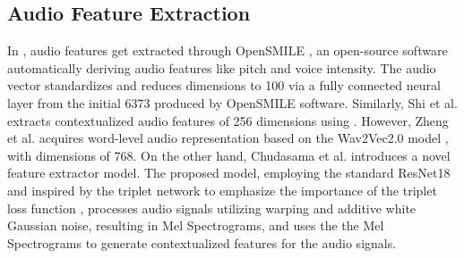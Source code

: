     \subsection{Audio Feature Extraction}
    In \cite{cmn, bclstm, dialoguernn, dialoguetrm, multiemo}, audio features get extracted through OpenSMILE \cite{opensmile}, an open-source software automatically deriving audio features like pitch and voice intensity. The audio vector standardizes and reduces dimensions to 100 via a fully connected neural layer from the initial 6373 produced by OpenSMILE software. Similarly, Shi et al. \cite{multiemo} extracts contextualized audio features of 256 dimensions using \cite{dialoguernn}. However, Zheng et al. \cite{fmmt} acquires word-level audio representation based on the Wav2Vec2.0 model \cite{w2v}, with dimensions of 768. On the other hand, Chudasama et al. \cite{m2fnet} introduces a novel feature extractor model. The proposed model, employing the standard ResNet18 \cite{resnet} and inspired by the triplet network to emphasize the importance of the triplet loss function \cite{facenet}, processes audio signals utilizing warping and additive white Gaussian noise, resulting in Mel Spectrograms, and uses the the Mel Spectrograms to generate contextualized features for the audio signals.

